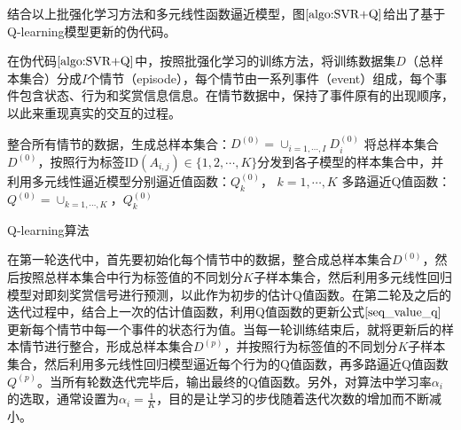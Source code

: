 结合以上批强化学习方法和多元线性函数逼近模型，图$\ref{algo:SVR+Q}$给出了基于Q-learning模型更新的伪代码。

在伪代码$\ref{algo:SVR+Q}$中，按照批强化学习的训练方法，将训练数据集$D$（总样本集合）分成$I$个情节（episode），每个情节由一系列事件（event）组成，每个事件包含状态、行为和奖赏信息信息。在情节数据中，保持了事件原有的出现顺序，以此来重现真实的交互的过程。

\begin{algorithm}[htbp]
\small
\SetAlgoLined
{} 

整合所有情节的数据，生成总样本集合：$D^{(0)}=\cup_{i=1,\cdots,I} D_{i}^{(0)}$\;
将总样本集合$D^{(0)}$，按照行为标签ID$(A_{i,j}) \in \{1,2,\cdots, K \}$分发到各子模型的样本集合中，并利用多元线性逼近模型分别逼近值函数：$Q_{k}^{(0)}$， $k=1,\cdots,K$\;
多路逼近Q值函数：$Q^{(0)}=\cup_{k=1,\cdots,K}，Q_{k}^{(0)}$\;
\caption{Q-learning算法}
\label{algo:SVR+Q}
\end{algorithm}

在第一轮迭代中，首先要初始化每个情节中的数据，整合成总样本集合$D^{(0)}$，然后按照总样本集合中行为标签值的不同划分$K$子样本集合，然后利用多元线性回归模型对即刻奖赏信号进行预测，以此作为初步的估计Q值函数。在第二轮及之后的迭代过程中，结合上一次的估计值函数，利用Q值函数的更新公式$\eqref{seq_value_q}$更新每个情节中每一个事件的状态行为值。当每一轮训练结束后，就将更新后的样本情节进行整合，形成总样本集合$D^{(p)}$，并按照行为标签值的不同划分$K$子样本集合，然后利用多元线性回归模型逼近每个行为的Q值函数，再多路逼近Q值函数$Q^{(p)}$。当所有轮数迭代完毕后，输出最终的Q值函数。另外，对算法中学习率$\alpha_{i}$的选取，通常设置为$\alpha_{i}=\frac{1}{K}$，目的是让学习的步伐随着迭代次数的增加而不断减小。

